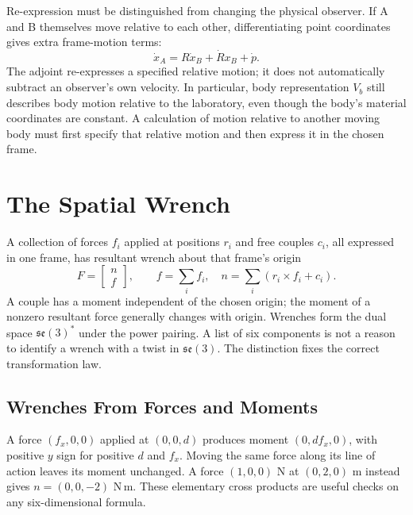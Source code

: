 Re-expression must be distinguished from changing the physical observer. If A and B themselves move relative to each other, differentiating point coordinates gives extra frame-motion terms:
\begin{equation}
 \dot x_A=R\dot x_B+\dot R x_B+\dot p.
\end{equation}
The adjoint re-expresses a specified relative motion; it does not automatically subtract an observer's own velocity. In particular, body representation $V_b$ still describes body motion relative to the laboratory, even though the body's material coordinates are constant. A calculation of motion relative to another moving body must first specify that relative motion and then express it in the chosen frame.

\section{The Spatial Wrench}
\label{sec:spatial_wrench}
\label{def:wrench_dual}
\label{def:spatial_wrench}

A collection of forces $f_i$ applied at positions $r_i$ and free couples $c_i$, all expressed in one frame, has resultant wrench about that frame's origin
\begin{equation}
 F=\begin{bmatrix}n\\f\end{bmatrix},\qquad
 f=\sum_i f_i,\quad n=\sum_i(r_i\times f_i+c_i).
\end{equation}
\label{eq:wrench_def}
A couple has a moment independent of the chosen origin; the moment of a nonzero resultant force generally changes with origin. Wrenches form the dual space $\mathfrak{se}(3)^*$ under the power pairing. A list of six components is not a reason to identify a wrench with a twist in $\mathfrak{se}(3)$. The distinction fixes the correct transformation law.

\subsection{Wrenches From Forces and Moments}

A force $(f_x,0,0)$ applied at $(0,0,d)$ produces moment $(0,df_x,0)$, with positive $y$ sign for positive $d$ and $f_x$. Moving the same force along its line of action leaves its moment unchanged. A force $(1,0,0)$ N at $(0,2,0)$ m instead gives $n=(0,0,-2)$ N\,m. These elementary cross products are useful checks on any six-dimensional formula.

